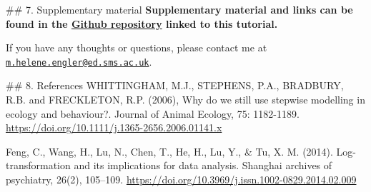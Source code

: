 \documentclass[
]{article}
\begin{document}
\#\# 7. Supplementary material \textbf{Supplementary material and links
can be found in the
\href{https://github.com/EdDataScienceEES/tutorial-HeleneEngler}{Github
repository} linked to this tutorial. }

If you have any thoughts or questions, please contact me at
\href{mailto:m.helene.engler@ed.sms.ac.uk}{\nolinkurl{m.helene.engler@ed.sms.ac.uk}}.

\#\# 8. References WHITTINGHAM, M.J., STEPHENS, P.A., BRADBURY, R.B. and
FRECKLETON, R.P. (2006), Why do we still use stepwise modelling in
ecology and behaviour?. Journal of Animal Ecology, 75: 1182-1189.
\url{https://doi.org/10.1111/j.1365-2656.2006.01141.x}

Feng, C., Wang, H., Lu, N., Chen, T., He, H., Lu, Y., \& Tu, X. M.
(2014). Log-transformation and its implications for data analysis.
Shanghai archives of psychiatry, 26(2), 105--109.
\url{https://doi.org/10.3969/j.issn.1002-0829.2014.02.009}
\end{document}
